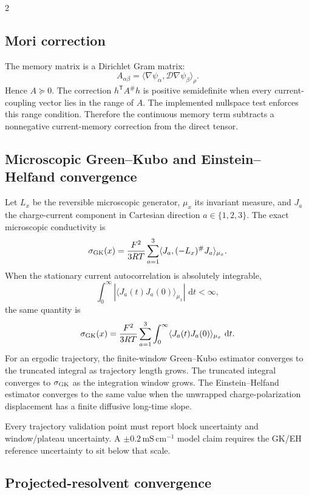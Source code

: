 \documentclass[10pt]{article}
\newcommand{\dd}{\,\mathrm d}
\newcommand{\T}{\mathsf{T}}
\begin{document}
\begin{multicols}{2}
\subsection{Mori correction}

The memory matrix is a Dirichlet Gram matrix:
\[
A_{\alpha\beta}
=
\langle\nabla\psi_\alpha,\mathcal D\nabla\psi_\beta\rangle_{\rho}.
\]
Hence \(A\succeq0\). The correction \(h^\T A^\#h\) is positive semidefinite
when every current-coupling vector lies in the range of \(A\). The implemented
nullspace test enforces this range condition. Therefore the continuous memory
term subtracts a nonnegative current-memory correction from the direct tensor.

\subsection{Microscopic Green--Kubo and Einstein--Helfand convergence}

Let \(L_x\) be the reversible microscopic generator, \(\mu_x\) its invariant
measure, and \(J_a\) the charge-current component in Cartesian direction
\(a\in\{1,2,3\}\). The exact microscopic conductivity is
\[
\sigma_{\rm GK}(x)
=
\frac{F^2}{3RT}
\sum_{a=1}^3
\langle J_a,(-L_x)^\#J_a\rangle_{\mu_x}.
\]
When the stationary current autocorrelation is absolutely integrable,
\[
\int_0^\infty
\left|\langle J_a(t)J_a(0)\rangle_{\mu_x}\right|\,\dd t<\infty,
\]
the same quantity is
\[
\sigma_{\rm GK}(x)
=
\frac{F^2}{3RT}
\sum_{a=1}^3
\int_0^\infty
\langle J_a(t)J_a(0)\rangle_{\mu_x}\,\dd t.
\]
For an ergodic trajectory, the finite-window Green--Kubo estimator converges to
the truncated integral as trajectory length grows. The truncated integral
converges to \(\sigma_{\rm GK}\) as the integration window grows. The
Einstein--Helfand estimator converges to the same value when the unwrapped
charge-polarization displacement has a finite diffusive long-time slope.

Every trajectory validation point must report block uncertainty and
window/plateau uncertainty. A \(\pm0.2\,\mathrm{mS\,cm^{-1}}\) model claim
requires the GK/EH reference uncertainty to sit below that scale.

\subsection{Projected-resolvent convergence}


\end{multicols}
\end{document}
